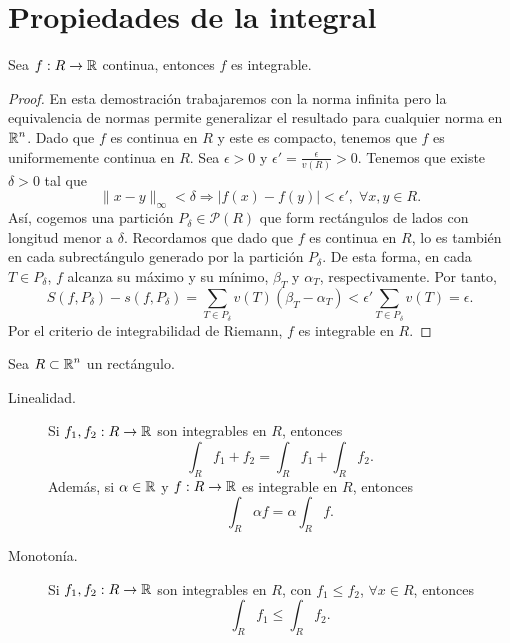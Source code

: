 \section{Propiedades de la integral}
\begin{theorem}
Sea $\displaystyle f : R \to \mathbb{R} $ continua, entonces $\displaystyle f $ es integrable. 
\end{theorem}
\begin{proof}
En esta demostración trabajaremos con la norma infinita pero la equivalencia de normas permite generalizar el resultado para cualquier norma en $\displaystyle \mathbb{R}^{n} $. Dado que $\displaystyle f $ es continua en $\displaystyle R $ y este es compacto, tenemos que $\displaystyle f $ es uniformemente continua en $\displaystyle R $. Sea $\displaystyle \epsilon > 0 $ y $\displaystyle \epsilon ' = \frac{\epsilon }{v\left(R\right)} > 0 $. Tenemos que existe $\displaystyle \delta > 0 $ tal que 
\[ \|x -y\|_{\infty} < \delta \Rightarrow \left|f\left(x\right)-f\left(y\right)\right| < \epsilon ' , \; \forall x,y \in R.\]
Así, cogemos una partición $\displaystyle P_{\delta} \in \mathcal{P}\left(R\right) $ que form rectángulos de lados con longitud menor a $\displaystyle \delta  $. Recordamos que dado que $\displaystyle f $ es continua en $\displaystyle R $, lo es también en cada subrectángulo generado por la partición $\displaystyle P_{\delta } $. De esta forma, en cada $\displaystyle T \in P_{\delta } $, $\displaystyle f $ alcanza su máximo y su mínimo, $\displaystyle \beta _{T} $ y $\displaystyle \alpha_{T} $, respectivamente. Por tanto,
\[S\left(f,P_{\delta }\right)-s\left(f,P_{\delta }\right) = \sum_{T \in P_{\delta }}v\left(T\right)\left(\beta_{T}-\alpha_{T}\right) < \epsilon ' \sum_{T \in P_{\delta }}v\left(T\right) = \epsilon .\]
Por el criterio de integrabilidad de Riemann, $\displaystyle f $ es integrable en $\displaystyle R $. 
\end{proof}
\begin{prop} Sea $\displaystyle R \subset \mathbb{R}^{n} $ un rectángulo.
	\begin{description}
	\item[Linealidad.] Si $\displaystyle f_{1}, f_{2} : R \to \mathbb{R} $ son integrables en $\displaystyle R $, entonces
\[\int _{R}f_{1} + f_{2} = \int _{R}f_{1} +\int _{R}f_{2}  .\]
Además, si $\displaystyle \alpha \in \mathbb{R} $ y $\displaystyle f : R \to \mathbb{R} $ es integrable en $\displaystyle R $, entonces
\[\int _{R}\alpha f = \alpha\int_{R} f .\]
\item[Monotonía.] Si $\displaystyle f_{1}, f_{2} : R \to \mathbb{R}$ son integrables en $\displaystyle R $, con $\displaystyle f_{1} \leq f_{2} $, $\displaystyle \forall x \in R $, entonces 
\[\int _{R}f_{1} \leq \int _{R}f_{2}  .\]
	\end{description}
\end{prop}
